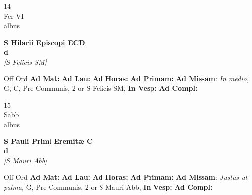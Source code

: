 \documentclass[10pt, openany]{book}
\begin{document}
    \begin{center}
        \begin{minipage}{3.5in}
            \vspace{2em}
            \begin{minipage}{0.5in}
                {\Huge 14} \\
                {\normalsize Fer VI} \\
                {\normalsize albus}
            \end{minipage}
            \begin{minipage}{3.0in}
                \textbf{ \large S Hilarii Episcopi ECD \\
                \textnormal{\normalsize d}} \\ \textit{[S Felicis SM]} \\ 
            \end{minipage}
            \begin{justify}Off Ord
                \textbf{Ad Mat: }
                \textbf{Ad Lau: }
                \textbf{Ad Horas: }
                \textbf{Ad Primam: }\textbf{Ad Missam}: \textit{In medio,} G, C, Pre Communis, 2 or S Felicis SM,  
                \textbf{In Vesp: }
                \textbf{Ad Compl: }
            \end{justify}
        \end{minipage}
    \end{center}

    \begin{center}
        \begin{minipage}{3.5in}
            \vspace{2em}
            \begin{minipage}{0.5in}
                {\Huge 15} \\
                {\normalsize Sabb} \\
                {\normalsize albus}
            \end{minipage}
            \begin{minipage}{3.0in}
                \textbf{ \large S Pauli Primi Eremitæ C \\
                \textnormal{\normalsize d}} \\ \textit{[S Mauri Abb]} \\ 
            \end{minipage}
            \begin{justify}Off Ord
                \textbf{Ad Mat: }
                \textbf{Ad Lau: }
                \textbf{Ad Horas: }
                \textbf{Ad Primam: }\textbf{Ad Missam}: \textit{Justus ut palma,} G, Pre Communis, 2 or S Mauri Abb,  
                \textbf{In Vesp: }
                \textbf{Ad Compl: }
            \end{justify}
        \end{minipage}
    \end{center}
\end{document}
